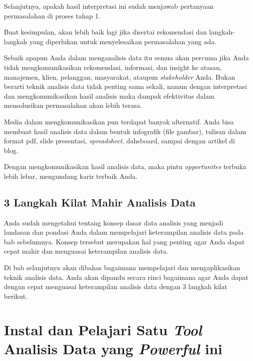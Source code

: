 \documentclass[openany]{book}
\begin{document}
Selanjutnya, apakah hasil interpretasi ini sudah menjawab pertanyaan
permasalahan di proses tahap 1.

Buat kesimpulan, akan lebih baik lagi jika disertai rekomendasi dan
langkah-langkah yang diperlukan untuk menyelesaikan permasalahan yang
ada.

Sebaik apapun Anda dalam menganalisis data itu semua akan percuma jika
Anda tidak mengkomunikasikan rekomendasi, informasi, dan insight ke
atasan, manajemen, klien, pelanggan, masyarakat, ataupun
\emph{stakeholder} Anda. Bukan berarti teknik analisis data tidak
penting sama sekali, namun dengan interpretasi dan mengkomunikasikan
hasil analisis maka dampak efektivitas dalam mensolusikan permasalahan
akan lebih terasa.

Media dalam mengkomunikasikan pun terdapat banyak alternatif. Anda bisa
membuat hasil analisis data dalam bentuk infografik (file gambar),
tulisan dalam format pdf, slide presentasi, \emph{spreadsheet},
dahsboard, sampai dengan artikel di blog.

Dengan mengkomunikasikan hasil analisis data, maka pintu
\emph{opportunites} terbuka lebih lebar, mengundang karir terbaik Anda.

\section*{3 Langkah Kilat Mahir Analisis
Data}\label{langkah-kilat-mahir-analisis-data}

Anda sudah mengetahui tentang konsep dasar data analisis yang menjadi
landasan dan pondasi Anda dalam mempelajari keterampilan analisis data
pada bab sebelumnya. Konsep tersebut merupakan hal yang penting agar
Anda dapat cepat mahir dan menguasai keterampilan analisis data.

Di bab selanjutnya akan dibahas bagaimana mempelajari dan
mengaplikasikan teknik analisis data. Anda akan dipandu secara rinci
bagaimana agar Anda dapat dengan cepat menguasai keterampilan analisis
data dengan 3 langkah kilat berikut.

\chapter{\texorpdfstring{Instal dan Pelajari Satu \emph{Tool} Analisis
Data yang \emph{Powerful}
ini}{Instal dan Pelajari Satu Tool Analisis Data yang Powerful ini}}\label{instal-dan-pelajari-satu-tool-analisis-data-yang-powerful-ini}
\end{document}
